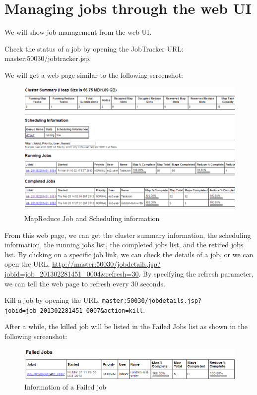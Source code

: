 \section{Managing jobs through the web UI}
We will show job management from the web UI.

Check the status of a job by opening the JobTracker URL: master:50030/jobtracker.jsp.

We will get a web page similar to the following screenshot:
\begin{figure}[h]
  \centering
  \includegraphics[width=\textwidth]{figs/5163os_04_11.png}
  \caption{MapReduce Job and Scheduling information}\label{fig:mapred.status}
\end{figure} 

From this web page, we can get the cluster summary information, the scheduling information, the running jobs list, the completed jobs list, and the retired jobs list. By clicking on a specific job link, we can check the details of a job, or we can open the URL, \url{http://master:50030/jobdetails.jsp?jobid=job_201302281451_0004&refresh=30}. By specifying the refresh parameter, we can tell the web page to refresh every 30 seconds.

Kill a job by opening the URL, \verb|master:50030/jobdetails.jsp?jobid=job_201302281451_0007&action=kill|.

After a while, the killed job will be listed in the Failed Jobs list as shown in the following screenshot:
\begin{figure}[h]
  \centering
  \includegraphics[width=\textwidth]{figs/5163os_04_12.png}
  \caption{Information of a Failed job}\label{fig:failed.job}
\end{figure} 

